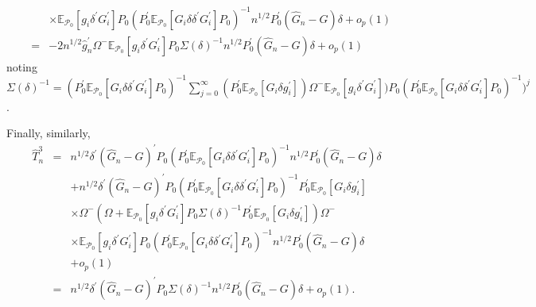 \documentclass[hidelinks, 11 pt, a4paper, pdflatex]{article}
\begin{document}
{\begin{eqnarray}
                     &   & \times \mathbb{E}_{\mathcal{P}_{0}}[g_{i}\delta ^{\prime }G_{i}^{\prime}]P_{0}
                               (P_{0}^{\prime}\mathbb{E}_{\mathcal{P}_{0}}[G_{i}\delta \delta ^{\prime}G_{i}^{\prime}]P_{0})^{-1}
                                n^{1/2}P_{0}^{\prime}(\hat{G}_{n} - G)\delta + o_{p}(1)  \nonumber \\
                     & = & -2n^{1/2}\hat{g}_{n}^{\prime}\Omega^{-}
                               \mathbb{E}_{\mathcal{P}_{0}}[g_{i}\delta^{\prime}G_{i}^{\prime}]
                               P_{0}\Sigma(\delta)^{-1}
                               n^{1/2}P_{0}^{\prime}(\hat{G}_{n} - G)\delta + o_{p}(1) \label{B.2}
    \end{eqnarray}%
   noting $\Sigma(\delta)^{-1} = (P_{0}^{\prime}\mathbb{E}_{\mathcal{P}_{0}}[G_{i}\delta \delta^{\prime}G_{i}^{\prime}]P_{0})^{-1} \sum_{j=0}^{\infty} (P_{0}^{\prime}\mathbb{E}_{\mathcal{P}_{0}}[G_{i}\delta g_{i}^{\prime}])\Omega^{-} \mathbb{E}_{\mathcal{P}_{0}}[g_{i}\delta^{\prime}G_{i}^{\prime}])P_{0} (P_{0}^{\prime}\mathbb{E}_{\mathcal{P}_{0}}[G_{i}\delta \delta ^{\prime }G_{i}^{\prime}]P_{0})^{-1})^{j}$.

   Finally, similarly,
    \begin{eqnarray}
     \hat{T}_{n}^{3} & = & n^{1/2}\delta^{\prime}(\hat{G}_{n} - G)^{\prime}P_{0}
                            (P_{0}^{\prime}\mathbb{E}_{\mathcal{P}_{0}}[G_{i}\delta \delta^{\prime}G_{i}^{\prime }]P_{0})^{-1}
                            n^{1/2}P_{0}^{\prime}(\hat{G}_{n} - G)\delta \nonumber \\
                     &   & + n^{1/2}\delta^{\prime}(\hat{G}_{n} - G)^{\prime}P_{0}
                            (P_{0}^{\prime}\mathbb{E}_{\mathcal{P}_{0}}[G_{i}\delta \delta^{\prime}G_{i}^{\prime}]P_{0})^{-1}
                            P_{0}^{\prime}\mathbb{E}_{\mathcal{P}_{0}}[G_{i}\delta g_{i}^{\prime}] \nonumber \\
                     &   & \times \Omega^{-}
                            (\Omega + \mathbb{E}_{\mathcal{P}_{0}}[g_{i}\delta^{\prime}G_{i}^{\prime}]
                              P_{0}\Sigma(\delta)^{-1}P_{0}^{\prime}
                            \mathbb{E}_{\mathcal{P}_{0}}[G_{i}\delta g_{i}^{\prime}])\Omega^{-}  \nonumber \\
                     &   & \times \mathbb{E}_{\mathcal{P}_{0}}[g_{i}\delta^{\prime}G_{i}^{\prime}]P_{0}
                             (P_{0}^{\prime}\mathbb{E}_{\mathcal{P}_{0}}[G_{i}\delta \delta^{\prime}G_{i}^{\prime }]P_{0})^{-1}
                            n^{1/2}P_{0}^{\prime}(\hat{G}_{n} - G)\delta \nonumber \\
                     &   & + o_{p}(1)  \nonumber \\
                     & = & n^{1/2}\delta^{\prime}(\hat{G}_{n} - G)^{\prime}P_{0}\Sigma(\delta)^{-1}
                            n^{1/2}P_{0}^{\prime}(\hat{G}_{n} - G)\delta + o_{p}(1).  \label{B.3}
    \end{eqnarray}

}
\end{document}
